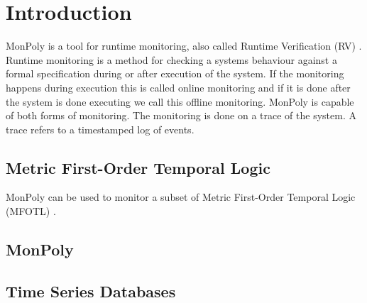 \section{Introduction}

MonPoly \cite{Basin2017} is a tool for runtime monitoring, also called Runtime Verification (RV) \cite{Bartocci2018}.
Runtime monitoring is a method for checking a systems behaviour against a formal specification during or after execution of the system.
If the monitoring happens during execution this is called online monitoring and if it is done after the system is done executing we call this offline monitoring.
MonPoly is capable of both forms of monitoring.
The monitoring is done on a trace of the system.
A trace refers to a timestamped log of events.




\subsection{Metric First-Order Temporal Logic}
MonPoly can be used to monitor a subset of Metric First-Order Temporal Logic (MFOTL) \cite{Basin2015}.

\subsection{MonPoly}

\subsection{Time Series Databases}

